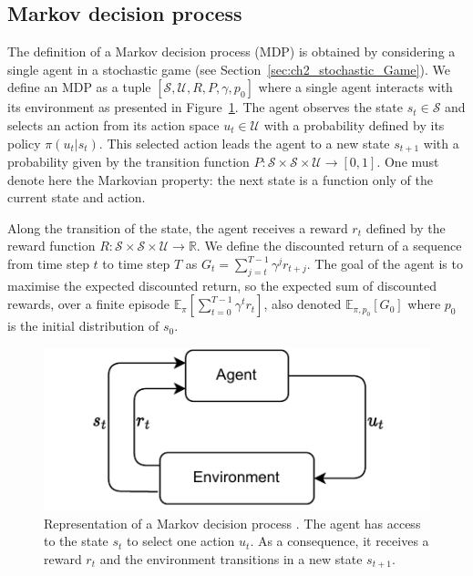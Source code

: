 \subsection{Markov decision process}
\label{sec:ch2_mdp}

The definition of a Markov decision process (MDP) is obtained by considering a single agent in a stochastic game (see Section~\ref{sec:ch2_stochastic_Game}).
We define an MDP as a tuple $[\mathcal{S}, \mathcal{U}, R, P, \gamma, p_0]$ where a single agent interacts with its environment as presented in Figure~\ref{fig:ch2_mdp}.
The agent observes the state $s_t \in \mathcal{S}$ and selects an action from its action space $u_t \in \mathcal{U}$ with a probability defined by its policy $\pi(u_t|s_t)$.
This selected action leads the agent to a new state $s_{t+1}$ with a probability given by the transition function $P:\mathcal{S} \times \mathcal{S} \times \mathcal{U} \rightarrow [0,1]$.
One must denote here the Markovian property: the next state is a function only of the current state and action.

Along the transition of the state, the agent receives a reward $r_t$ defined by the reward function $R:\mathcal{S} \times \mathcal{S} \times \mathcal{U} \rightarrow \mathbb{R}$.
We define the discounted return of a sequence from time step $t$ to time step $T$ as $G_t= \sum_{j=t}^{T-1} \gamma^j r_{t+j}$.
The goal of the agent is to maximise the expected discounted return, so the expected sum of discounted rewards, over a finite episode $\mathbb{E}_{\pi} \left[\sum_{t=0}^{T-1} \gamma^t r_t \right]$, also denoted $\mathbb{E}_{\pi, p_0}\left[ G_0 \right]$ where $p_0$ is the initial distribution of $s_0$.

\begin{figure}
    \centering
    \includegraphics[width=.8\linewidth]{tex_thesis/figures/ch2/MDP.pdf}
    \caption{Representation of a Markov decision process \citep{sutton2018reinforcement}. The agent has access to the state $s_t$ to select one action $u_t$. As a consequence, it receives a reward $r_t$ and the environment transitions in a new state $s_{t+1}$.}
    \label{fig:ch2_mdp}
\end{figure}


